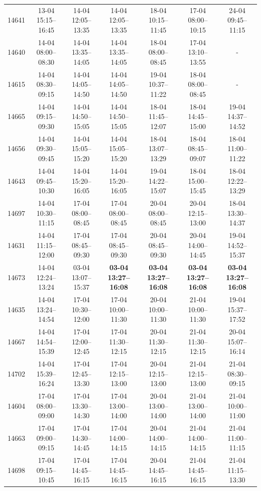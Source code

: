 \begin{table}[htbp]
\begin{tabular}{|r|c|c|c|c|c|c|}
14641 & 13-04 15:15--16:45 & 14-04 12:05--13:35 & 14-04 12:05--13:35 & 18-04 10:15--11:45 & 17-04 08:00--10:15 & 24-04 09:45--11:15 \\ 
14640 & 14-04 08:00--08:30 & 14-04 13:35--14:05 & 14-04 13:35--14:05 & 18-04 08:00--08:45 & 17-04 13:10--13:55 & - \\ 
14615 & 14-04 08:30--09:15 & 14-04 14:05--14:50 & 14-04 14:05--14:50 & 19-04 10:37--11:22 & 18-04 08:00--08:45 & - \\ 
14665 & 14-04 09:15--09:30 & 14-04 14:50--15:05 & 14-04 14:50--15:05 & 18-04 11:45--12:07 & 18-04 14:45--15:00 & 19-04 14:37--14:52 \\ 
14656 & 14-04 09:30--09:45 & 14-04 15:05--15:20 & 14-04 15:05--15:20 & 18-04 13:07--13:29 & 18-04 08:45--09:07 & 18-04 11:00--11:22 \\ 
14643 & 14-04 09:45--10:30 & 14-04 15:20--16:05 & 14-04 15:20--16:05 & 19-04 14:22--15:07 & 18-04 15:00--15:45 & 18-04 12:22--13:29 \\ 
14697 & 14-04 10:30--11:15 & 17-04 08:00--08:45 & 17-04 08:00--08:45 & 20-04 08:00--08:45 & 20-04 12:15--13:00 & 18-04 13:30--14:37 \\ 
14631 & 14-04 11:15--12:00 & 17-04 08:45--09:30 & 17-04 08:45--09:30 & 20-04 08:45--09:30 & 20-04 14:00--14:45 & 19-04 14:52--15:37 \\ 
14673 & 14-04 12:24--13:24 & 03-04 13:07--15:37 & \textbf{03-04 13:27--16:08} & \textbf{03-04 13:27--16:08} & \textbf{03-04 13:27--16:08} & \textbf{03-04 13:27--16:08} \\ 
14635 & 14-04 13:24--14:54 & 17-04 10:30--12:00 & 17-04 10:00--11:30 & 20-04 10:00--11:30 & 21-04 10:00--11:30 & 19-04 15:37--17:52 \\ 
14667 & 14-04 14:54--15:39 & 17-04 12:00--12:45 & 17-04 11:30--12:15 & 20-04 11:30--12:15 & 21-04 11:30--12:15 & 20-04 15:07--16:14 \\ 
14702 & 14-04 15:39--16:24 & 17-04 12:45--13:30 & 17-04 12:15--13:00 & 20-04 12:15--13:00 & 21-04 12:15--13:00 & 21-04 08:30--09:15 \\ 
14604 & 17-04 08:00--09:00 & 17-04 13:30--14:30 & 17-04 13:00--14:00 & 20-04 13:00--14:00 & 21-04 13:00--14:00 & 21-04 10:00--11:00 \\ 
14663 & 17-04 09:00--09:15 & 17-04 14:30--14:45 & 17-04 14:00--14:15 & 20-04 14:00--14:15 & 21-04 14:00--14:15 & 21-04 11:00--11:15 \\ 
14698 & 17-04 09:15--10:45 & 17-04 14:45--16:15 & 17-04 14:45--16:15 & 20-04 14:45--16:15 & 21-04 14:45--16:15 & 21-04 11:15--13:30 \\ 

\end{tabular}
\end{table}
